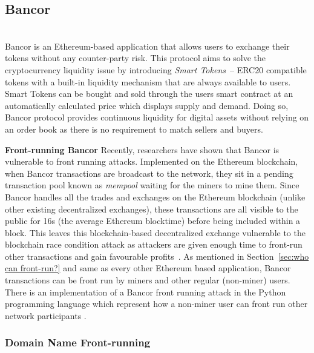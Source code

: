 \subsection{Bancor} \hfill\\
\noindent Bancor is an Ethereum-based application that allows users to exchange their tokens without any counter-party risk. This protocol aims to solve the cryptocurrency liquidity issue by introducing \textit{Smart Tokens}~\cite{hertzog2017bancor}-- ERC20 compatible tokens with a built-in liquidity mechanism that are always available to users. Smart Tokens can be bought and sold through the users smart contract at an automatically calculated price which displays supply and demand. Doing so, Bancor protocol provides continuous liquidity for digital assets without relying on an order book as there is no requirement to match sellers and buyers.

\par\noindent\textbf{Front-running Bancor} Recently, researchers have shown that Bancor is vulnerable to front running attacks. Implemented on the Ethereum blockchain, when Bancor transactions are broadcast to the network, they sit in a pending transaction pool known as \textit{mempool} waiting for the miners to mine them. Since Bancor handles all the trades and exchanges on the Ethereum blockchain (unlike other existing decentralized exchanges), these transactions are all visible to the public for 16s (the average Ethereum blocktime) before being included within a block. This leaves this blockchain-based decentralized exchange vulnerable to the blockchain race condition attack as attackers are given enough time to front-run other transactions and gain favourable profits~\cite{BancorIs7:online}. As mentioned in Section~\ref{sec:who can front-run?} and same as every other Ethereum based application, Bancor transactions can be front run by miners and other regular (non-miner) users. There is an implementation of a Bancor front running attack in the Python programming language which represent how a non-miner user can front run other network participants \cite{NewTab13:online}.



\subsubsection{Domain Name Front-running} \hfill\\    %

